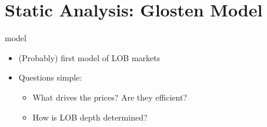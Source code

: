 \documentclass[english,10pt
,aspectratio=169
]{beamer}
\begin{document}



\section{Static Analysis: Glosten Model}

\begin{frame}{\cite{glosten_is_1994} model}
	\begin{itemize}
		\item (Probably) first model of LOB markets
		\item Questions simple:
		\begin{itemize}
			\item What drives the prices? Are they efficient?
			\item How is LOB depth determined?
		\end{itemize}
	\end{itemize}
\end{frame}
\end{document}
